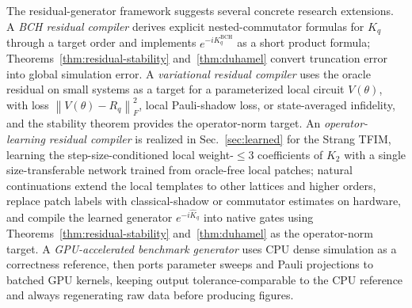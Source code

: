 \documentclass[aps,prxquantum,reprint,superscriptaddress,nofootinbib,amsmath,amssymb]{revtex4-2}
\newcommand{\tfim}{TFIM}
\newcommand{\norm}[1]{\left\lVert #1 \right\rVert}
\begin{document}
The residual-generator framework suggests several concrete research extensions. A \emph{BCH residual compiler} derives explicit nested-commutator formulas for $K_q$ through a target order and implements $e^{-iK_q^{\mathrm{BCH}}}$ as a short product formula; Theorems~\ref{thm:residual-stability} and~\ref{thm:duhamel} convert truncation error into global simulation error. A \emph{variational residual compiler} uses the oracle residual on small systems as a target for a parameterized local circuit $V(\theta)$, with loss $\norm{V(\theta)-R_q}_F^2$, local Pauli-shadow loss, or state-averaged infidelity, and the stability theorem provides the operator-norm target. An \emph{operator-learning residual compiler} is realized in Sec.~\ref{sec:learned} for the Strang \tfim{}, learning the step-size-conditioned local weight-$\leq3$ coefficients of $K_2$ with a single size-transferable network trained from oracle-free local patches; natural continuations extend the local templates to other lattices and higher orders, replace patch labels with classical-shadow or commutator estimates on hardware, and compile the learned generator $e^{-i\widehat K_q}$ into native gates using Theorems~\ref{thm:residual-stability} and~\ref{thm:duhamel} as the operator-norm target. A \emph{GPU-accelerated benchmark generator} uses CPU dense simulation as a correctness reference, then ports parameter sweeps and Pauli projections to batched GPU kernels, keeping output tolerance-comparable to the CPU reference and always regenerating raw data before producing figures.
\end{document}
